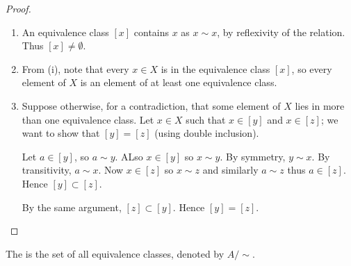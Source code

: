 \begin{proof} \
\begin{enumerate}[label=(\roman*)]
\item An equivalence class $[x]$ contains $x$ as $x\sim x$, by reflexivity of the relation. Thus $[x]\neq\emptyset$.
\item From (i), note that every $x\in X$ is in the equivalence class $[x]$, so every element of $X$ is an element of at least one equivalence class.
\item Suppose otherwise, for a contradiction, that some element of $X$ lies in more than one equivalence class. Let $x\in X$ such that $x\in[y]$ and $x\in[z]$; we want to show that $[y]=[z]$ (using double inclusion).

Let $a\in[y]$, so $a\sim y$. ALso $x\in[y]$ so $x\sim y$. By symmetry, $y\sim x$. By transitivity, $a\sim x$. Now $x\in[z]$ so $x\sim z$ and similarly $a\sim z$ thus $a\in[z]$. Hence $[y]\subset[z]$.

By the same argument, $[z]\subset[y]$. Hence $[y]=[z]$.
\end{enumerate}
\end{proof}

\begin{definition}
The  is the set of all equivalence classes, denoted by $A/\sim$.
\end{definition}

